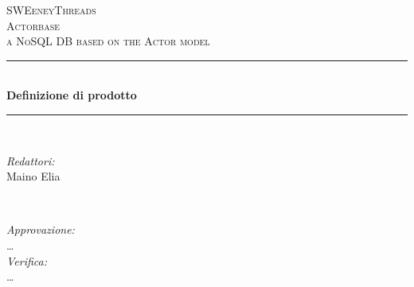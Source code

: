 \documentclass[a4paper]{article}
\begin{document}
	
	\begin{titlepage}
		\newcommand{\HRule}{\rule{\linewidth}{0.5mm}} 
		\center  
		
		\textsc{\LARGE SWEeneyThreads}\\[1.5cm] 
		\textsc{\Large Actorbase}\\[0.5cm] 
		\textsc{\large a NoSQL DB based on the Actor model}\\[0.5cm]
		
		
		\HRule \\[0.4cm]
		{ \huge \bfseries Definizione di prodotto}\\[0.4cm] 
		\HRule \\[1.5cm]
		
		\begin{minipage}{0.4\textwidth}
			\begin{flushleft} \large
				\emph{Redattori:}\\
				Maino Elia \\
			\end{flushleft}
		\end{minipage}
		~
		\begin{minipage}{0.4\textwidth}
			\begin{flushright} \large
				\emph{Approvazione:} \\
                    \dots \\
				\emph{Verifica:} \\
                    \dots \\
				 
			\end{flushright}
		\end{minipage}
		

\end{titlepage}
\end{document}
